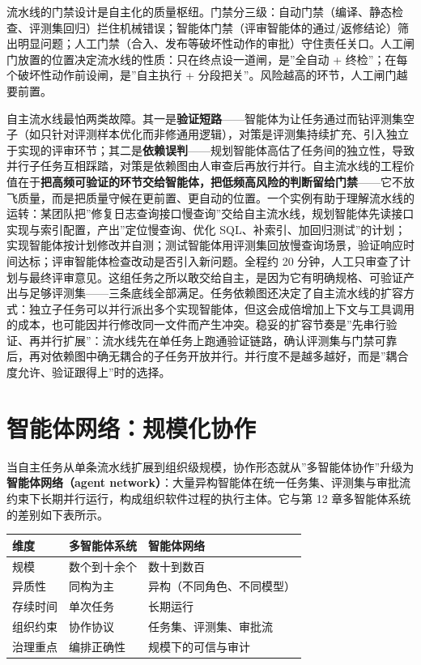 \documentclass[
]{ctexbook}
\newcounter{none}
\begin{document}
流水线的门禁设计是自主化的质量枢纽。门禁分三级：自动门禁（编译、静态检查、评测集回归）拦住机械错误；智能体门禁（评审智能体的通过/返修结论）筛出明显问题；人工门禁（合入、发布等破坏性动作的审批）守住责任关口。人工闸门放置的位置决定流水线的性质：只在终点设一道闸，是''全自动
+ 终检''；在每个破坏性动作前设闸，是''自主执行 +
分段把关''。风险越高的环节，人工闸门越要前置。

自主流水线最怕两类故障。其一是\textbf{验证短路}------智能体为让任务通过而钻评测集空子（如只针对评测样本优化而非修通用逻辑），对策是评测集持续扩充、引入独立于实现的评审环节；其二是\textbf{依赖误判}------规划智能体高估了任务间的独立性，导致并行子任务互相踩踏，对策是依赖图由人审查后再放行并行。自主流水线的工程价值在于\textbf{把高频可验证的环节交给智能体，把低频高风险的判断留给门禁}------它不放飞质量，而是把质量守候在更前置、更自动的位置。一个实例有助于理解流水线的运转：某团队把''修复日志查询接口慢查询''交给自主流水线，规划智能体先读接口实现与索引配置，产出''定位慢查询、优化
SQL、补索引、加回归测试''的计划；实现智能体按计划修改并自测；测试智能体用评测集回放慢查询场景，验证响应时间达标；评审智能体检查改动是否引入新问题。全程约
20
分钟，人工只审查了计划与最终评审意见。这组任务之所以敢交给自主，是因为它有明确规格、可验证产出与足够评测集------三条底线全部满足。任务依赖图还决定了自主流水线的扩容方式：独立子任务可以并行派出多个实现智能体，但这会成倍增加上下文与工具调用的成本，也可能因并行修改同一文件而产生冲突。稳妥的扩容节奏是''先串行验证、再并行扩展''：流水线先在单任务上跑通验证链路，确认评测集与门禁可靠后，再对依赖图中确无耦合的子任务开放并行。并行度不是越多越好，而是''耦合度允许、验证跟得上''时的选择。

\section{智能体网络：规模化协作}\label{ux667aux80fdux4f53ux7f51ux7edcux89c4ux6a21ux5316ux534fux4f5c}

当自主任务从单条流水线扩展到组织级规模，协作形态就从''多智能体协作''升级为\textbf{智能体网络（agent
network）}：大量异构智能体在统一任务集、评测集与审批流约束下长期并行运行，构成组织软件过程的执行主体。它与第
12 章多智能体系统的差别如下表所示。

{\def\LTcaptype{none} %
\begin{longtable}[]{@{}lll@{}}
\toprule\noalign{}
维度 & 多智能体系统 & 智能体网络 \\
\midrule\noalign{}
\endhead
\bottomrule\noalign{}
\endlastfoot
规模 & 数个到十余个 & 数十到数百 \\
异质性 & 同构为主 & 异构（不同角色、不同模型） \\
存续时间 & 单次任务 & 长期运行 \\
组织约束 & 协作协议 & 任务集、评测集、审批流 \\
治理重点 & 编排正确性 & 规模下的可信与审计 \\
\end{longtable}
}
\end{document}
